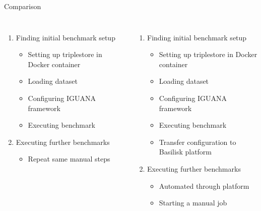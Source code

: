 \begin{frame}{Comparison}
	
	\begin{columns}[T]
		\begin{enumerate}
			\item Finding initial benchmark setup
			\begin{itemize}
				\item Setting up triplestore in Docker container
				\item Loading dataset
				\item Configuring IGUANA framework
				\item Executing benchmark
			\end{itemize}
		
			\vspace{.85cm}
			\item Executing further benchmarks
			\begin{itemize}
				\item Repeat same manual steps
			\end{itemize}
			
		\end{enumerate}
		
		
		\begin{enumerate}
			\item Finding initial benchmark setup
			\begin{itemize}
				\item Setting up triplestore in Docker container
				\item Loading dataset
				\item Configuring IGUANA framework
				\item Executing benchmark
				\item Transfer configuration to Basilisk platform
			\end{itemize}
		
			\item Executing further benchmarks
			\begin{itemize}
				\item Automated through platform
				\item Starting a manual job
			\end{itemize}
		\end{enumerate}
	\end{columns}
	
\end{frame}

